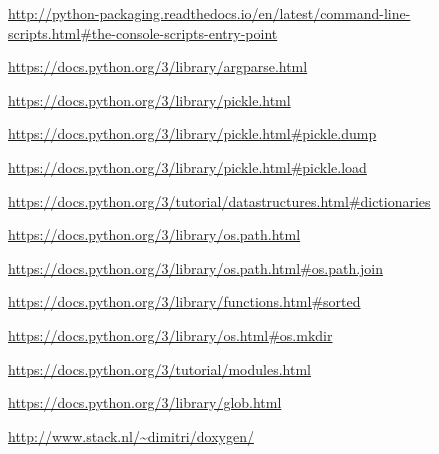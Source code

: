 \documentclass[a4paper,12pt, doubleside]{report}
\begin{document}
\begin{thebibliography}{1}
        \url{http://python-packaging.readthedocs.io/en/latest/command-line-scripts.html#the-console-scripts-entry-point}

        \url{https://docs.python.org/3/library/argparse.html}

        \url{https://docs.python.org/3/library/pickle.html}
    
        \url{https://docs.python.org/3/library/pickle.html#pickle.dump}
    
        \url{https://docs.python.org/3/library/pickle.html#pickle.load}
    
        \url{https://docs.python.org/3/tutorial/datastructures.html#dictionaries}

        \url{https://docs.python.org/3/library/os.path.html}

        \url{https://docs.python.org/3/library/os.path.html#os.path.join}

        \url{https://docs.python.org/3/library/functions.html#sorted}    
        
        \url{https://docs.python.org/3/library/os.html#os.mkdir}

        \url{https://docs.python.org/3/tutorial/modules.html}

        \url{https://docs.python.org/3/library/glob.html}
    

        
        \url{http://www.stack.nl/~dimitri/doxygen/}
            
    \end{thebibliography}
\end{document}
